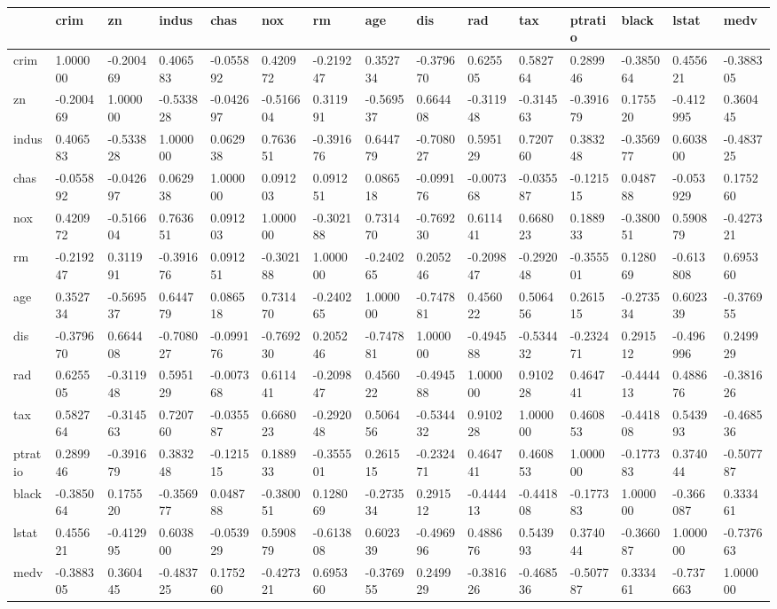 \documentclass[
  letterpaper,
  DIV=11,
  numbers=noendperiod]{scrreprt}
\begin{document}
\begin{longtable}[]{@{}lllllllllllllll@{}}
\toprule()
& crim & zn & indus & chas & nox & rm & age & dis & rad & tax & ptratio
& black & lstat & medv \\
\midrule()
\endhead
crim & 1.000000 & -0.200469 & 0.406583 & -0.055892 & 0.420972 &
-0.219247 & 0.352734 & -0.379670 & 0.625505 & 0.582764 & 0.289946 &
-0.385064 & 0.455621 & -0.388305 \\
zn & -0.200469 & 1.000000 & -0.533828 & -0.042697 & -0.516604 & 0.311991
& -0.569537 & 0.664408 & -0.311948 & -0.314563 & -0.391679 & 0.175520 &
-0.412995 & 0.360445 \\
indus & 0.406583 & -0.533828 & 1.000000 & 0.062938 & 0.763651 &
-0.391676 & 0.644779 & -0.708027 & 0.595129 & 0.720760 & 0.383248 &
-0.356977 & 0.603800 & -0.483725 \\
chas & -0.055892 & -0.042697 & 0.062938 & 1.000000 & 0.091203 & 0.091251
& 0.086518 & -0.099176 & -0.007368 & -0.035587 & -0.121515 & 0.048788 &
-0.053929 & 0.175260 \\
nox & 0.420972 & -0.516604 & 0.763651 & 0.091203 & 1.000000 & -0.302188
& 0.731470 & -0.769230 & 0.611441 & 0.668023 & 0.188933 & -0.380051 &
0.590879 & -0.427321 \\
rm & -0.219247 & 0.311991 & -0.391676 & 0.091251 & -0.302188 & 1.000000
& -0.240265 & 0.205246 & -0.209847 & -0.292048 & -0.355501 & 0.128069 &
-0.613808 & 0.695360 \\
age & 0.352734 & -0.569537 & 0.644779 & 0.086518 & 0.731470 & -0.240265
& 1.000000 & -0.747881 & 0.456022 & 0.506456 & 0.261515 & -0.273534 &
0.602339 & -0.376955 \\
dis & -0.379670 & 0.664408 & -0.708027 & -0.099176 & -0.769230 &
0.205246 & -0.747881 & 1.000000 & -0.494588 & -0.534432 & -0.232471 &
0.291512 & -0.496996 & 0.249929 \\
rad & 0.625505 & -0.311948 & 0.595129 & -0.007368 & 0.611441 & -0.209847
& 0.456022 & -0.494588 & 1.000000 & 0.910228 & 0.464741 & -0.444413 &
0.488676 & -0.381626 \\
tax & 0.582764 & -0.314563 & 0.720760 & -0.035587 & 0.668023 & -0.292048
& 0.506456 & -0.534432 & 0.910228 & 1.000000 & 0.460853 & -0.441808 &
0.543993 & -0.468536 \\
ptratio & 0.289946 & -0.391679 & 0.383248 & -0.121515 & 0.188933 &
-0.355501 & 0.261515 & -0.232471 & 0.464741 & 0.460853 & 1.000000 &
-0.177383 & 0.374044 & -0.507787 \\
black & -0.385064 & 0.175520 & -0.356977 & 0.048788 & -0.380051 &
0.128069 & -0.273534 & 0.291512 & -0.444413 & -0.441808 & -0.177383 &
1.000000 & -0.366087 & 0.333461 \\
lstat & 0.455621 & -0.412995 & 0.603800 & -0.053929 & 0.590879 &
-0.613808 & 0.602339 & -0.496996 & 0.488676 & 0.543993 & 0.374044 &
-0.366087 & 1.000000 & -0.737663 \\
medv & -0.388305 & 0.360445 & -0.483725 & 0.175260 & -0.427321 &
0.695360 & -0.376955 & 0.249929 & -0.381626 & -0.468536 & -0.507787 &
0.333461 & -0.737663 & 1.000000 \\
\bottomrule()
\end{longtable}
\end{document}
